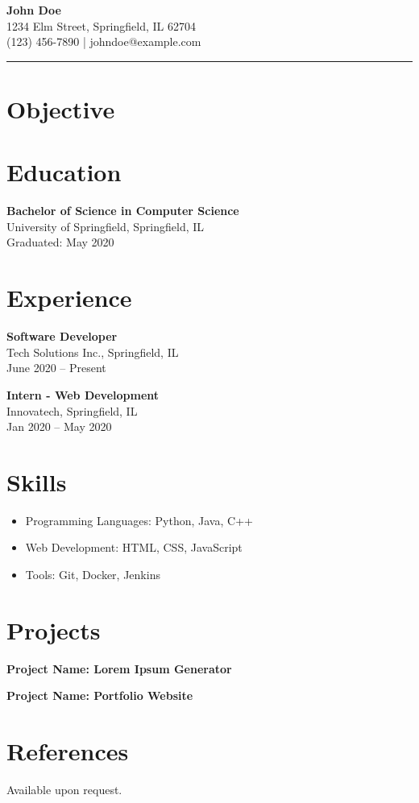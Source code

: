 \documentclass[a4paper,10pt]{article}
\begin{document}
\begin{center}
    {\LARGE \textbf{John Doe}} \\
    \vspace{0.2cm}
    \small
    1234 Elm Street, Springfield, IL 62704 \\
    (123) 456-7890 | johndoe@example.com \\
    \vspace{0.5cm}
    \hrule
\end{center}

\vspace{0.5cm}

\section*{Objective}
\lipsum[1]

\section*{Education}
\textbf{Bachelor of Science in Computer Science} \\
University of Springfield, Springfield, IL \\
Graduated: May 2020 \\
\lipsum[2][1-3]

\section*{Experience}
\textbf{Software Developer} \\
Tech Solutions Inc., Springfield, IL \\
June 2020 -- Present \\
\lipsum[3][1-4]

\textbf{Intern - Web Development} \\
Innovatech, Springfield, IL \\
Jan 2020 -- May 2020 \\
\lipsum[4][1-3]

\section*{Skills}
\begin{itemize}
    \item Programming Languages: Python, Java, C++
    \item Web Development: HTML, CSS, JavaScript
    \item Tools: Git, Docker, Jenkins
\end{itemize}

\section*{Projects}
\textbf{Project Name: Lorem Ipsum Generator} \\
\lipsum[5][1-2]

\textbf{Project Name: Portfolio Website} \\
\lipsum[6][1-2]

\section*{References}
Available upon request.
\end{document}
